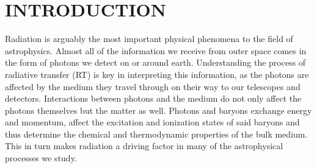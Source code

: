 \documentclass[fleq,usenatbib]{mnras}
\begin{document}
\section{INTRODUCTION}\label{sec:intr}
Radiation is arguably the most important physical phenomena to the field of
astrophysics. Almost all of the information we receive from outer space comes 
in the form of photons we detect on or around earth. Understanding the process 
of radiative transfer (RT) is key in interpreting this information, as the 
photons are affected by the medium they travel through on their way to our 
telescopes and detectors. Interactions between photons and the medium do not 
only affect the photons themselves but the matter as well. Photons and baryons 
exchange energy and momentum, affect the excitation and ionization states of 
said baryons and thus determine the chemical and thermodynamic properties of 
the bulk medium. This in turn makes radiation a driving factor in many of the 
astrophysical processes we study.
\end{document}
